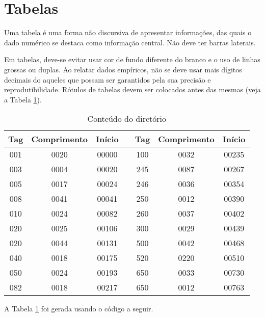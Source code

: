\section{Tabelas}
\label{sec:tabs} 

Uma tabela é uma forma não discursiva de apresentar informações, das quais o dado numérico se destaca como informação central. Não deve ter barras laterais.

Em tabelas, deve-se evitar usar cor de fundo diferente do branco e o uso de linhas grossas ou duplas. Ao relatar dados empíricos, não se deve usar mais dígitos decimais do aqueles que possam ser garantidos pela sua precisão e reprodutibilidade. Rótulos de tabelas devem ser colocados
antes das mesmas (veja a Tabela \ref{tab:MarcMNem}).

\begin{table}[ht!]
\caption{Conteúdo do diretório}
\label{tab:MarcMNem} 
\begin{center}
\begin{tabular}{c|c|c|c|c|c|c}
\hline Tag & Comprimento & Início &   & Tag & Comprimento & Início \\ 
\hline 001 & 0020 & 00000 && 100 & 0032 & 00235\\ 
\hline 003 & 0004 & 00020 && 245 & 0087 & 00267\\ 
\hline 005 & 0017 & 00024 && 246 & 0036 & 00354\\ 
\hline 008 & 0041 & 00041 && 250 & 0012 & 00390\\ 
\hline 010 & 0024 & 00082 && 260 & 0037 & 00402\\ 
\hline 020 & 0025 & 00106 && 300 & 0029 & 00439\\ 
\hline 020 & 0044 & 00131 && 500 & 0042 & 00468\\ 
\hline 040 & 0018 & 00175 && 520 & 0220 & 00510\\ 
\hline 050 & 0024 & 00193 && 650 & 0033 & 00730\\ 
\hline 082 & 0018 & 00217 && 650 & 0012 & 00763\\ 
\hline 
\end{tabular} 
\end{center}
\end{table}

A Tabela \ref{tab:MarcMNem} foi gerada usando o código a seguir.

